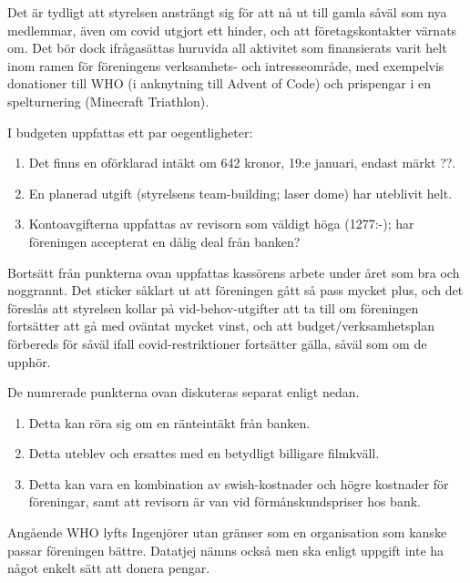\documentclass[a4paper]{article}
\begin{document}
\begin{displayquote}

Det är tydligt att styrelsen ansträngt sig för att nå ut till gamla såväl som
nya medlemmar, även om covid utgjort ett hinder, och att företagskontakter
värnats om. Det bör dock ifrågasättas huruvida all aktivitet som finansierats
varit helt inom ramen för föreningens verksamhets- och intresseområde, med
exempelvis donationer till WHO (i anknytning till Advent of Code) och prispengar
i en spelturnering (Minecraft Triathlon).

I budgeten uppfattas ett par oegentligheter:
\begin{enumerate}
\item Det finns en oförklarad intäkt om 642 kronor, 19:e januari, endast märkt ??.
\item En planerad utgift (styrelsens team-building; laser dome) har uteblivit helt.
\item Kontoavgifterna uppfattas av revisorn som väldigt höga (1277:-); har föreningen accepterat en dålig deal från banken?
\end{enumerate}

Bortsätt från punkterna ovan uppfattas kassörens arbete under året som bra och
noggrannt. Det sticker såklart ut att föreningen gått så pass mycket plus, och
det föreslås att styrelsen kollar på vid-behov-utgifter att ta till om
föreningen fortsätter att gå med oväntat mycket vinst, och att
budget/verksamhetsplan förbereds för såväl ifall covid-restriktioner fortsätter
gälla, såväl som om de upphör.

\end{displayquote}

De numrerade punkterna ovan diskuteras separat enligt nedan.

\begin{enumerate}
  \item Detta kan röra sig om en ränteintäkt från banken.
  \item Detta uteblev och ersattes med en betydligt billigare filmkväll.
  \item Detta kan vara en kombination av swish-kostnader och högre kostnader för
  föreningar, samt att revisorn är van vid förmånskundspriser hos bank.
\end{enumerate}

Angående WHO lyfts Ingenjörer utan gränser som en organisation som kanske passar
föreningen bättre. Datatjej nämns också men ska enligt uppgift inte ha något
enkelt sätt att donera pengar.
\end{document}
